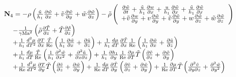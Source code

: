 \begin{equation*}
  \begin{array}{l}
 {\bf{N}}_4  =  - \rho \left( {\frac{{\tilde u}}{{h_1 }}\frac{{\partial \tilde w}}{{\partial x}} + \tilde v\frac{{\partial \tilde w}}{{\partial y}} + \tilde w\frac{{\partial \tilde w}}{{\partial z}}} \right) - \tilde \rho \left( \begin{array}{l}
 \frac{{\partial \tilde w}}{{\partial t}} + \frac{{\tilde u}}{{h_1 }}\frac{{\partial w}}{{\partial x}} + \frac{u}{{h_1 }}\frac{{\partial \tilde w}}{{\partial x}} + \frac{{\tilde u}}{{h_1 }}\frac{{\partial \tilde w}}{{\partial x}} \\
  + \tilde v\frac{{\partial w}}{{\partial y}} + v\frac{{\partial \tilde w}}{{\partial y}} + \tilde v\frac{{\partial \tilde w}}{{\partial y}} + w\frac{{\partial \tilde w}}{{\partial z}} + \tilde w\frac{{\partial \tilde w}}{{\partial z}} \\
 \end{array} \right) \\
 \quad \; - \frac{1}{{\gamma {\rm{Ma}}^2 }}\left( {\tilde \rho \frac{{\partial \tilde T}}{{\partial z}} + \tilde T\frac{{\partial \tilde \rho }}{{\partial z}}} \right) \\
 \quad \; + \frac{1}{{h_1 }}\frac{{d^2 \mu }}{{dT^2 }}\frac{{\partial T}}{{\partial x}}\frac{{\tilde T}}{{{\mathop{\rm Re}\nolimits} }}\left( {\frac{1}{{h_1 }}\frac{{\partial \tilde w}}{{\partial x}} + \frac{{\partial \tilde u}}{{\partial z}}} \right) + \frac{1}{{h_1 }}\frac{{d\mu }}{{dT}}\frac{{\partial \tilde T}}{{\partial x}}\frac{1}{{{\mathop{\rm Re}\nolimits} }}\left( {\frac{1}{{h_1 }}\frac{{\partial \tilde w}}{{\partial x}} + \frac{{\partial \tilde u}}{{\partial z}}} \right) \\
 \quad \; + \frac{1}{{h_1 }}\frac{{d\mu }}{{dT}}\frac{{\tilde T}}{{{\mathop{\rm Re}\nolimits} }}\left( {\frac{1}{{h_1 }}\frac{{\partial ^2 \tilde w}}{{\partial x^2 }} + \frac{{\partial ^2 \tilde u}}{{\partial x\partial z}}} \right) + \frac{1}{{h_1 }}\frac{{\partial h_1 }}{{\partial y}}\frac{1}{{{\mathop{\rm Re}\nolimits} }}\frac{{\partial \mu }}{{\partial T}}\tilde T\left( {\frac{{\partial \tilde v}}{{\partial z}} + \frac{{\partial \tilde w}}{{\partial y}}} \right) \\
 \quad \; + \frac{1}{{{\mathop{\rm Re}\nolimits} }}\frac{{d^2 \mu }}{{dT^2 }}\frac{{\partial T}}{{\partial y}}\tilde T\left( {\frac{{\partial \tilde v}}{{\partial z}} + \frac{{\partial \tilde w}}{{\partial y}}} \right) + \frac{1}{{{\mathop{\rm Re}\nolimits} }}\frac{{d\mu }}{{dT}}\frac{{\partial \tilde T}}{{\partial y}}\left( {\frac{{\partial \tilde v}}{{\partial z}} + \frac{{\partial \tilde w}}{{\partial y}}} \right) + \frac{1}{{{\mathop{\rm Re}\nolimits} }}\frac{{\partial \mu }}{{\partial T}}\tilde T\left( {\frac{{\partial ^2 \tilde v}}{{\partial y\partial z}} + \frac{{\partial ^2 \tilde w}}{{\partial y^2 }}} \right) \\

\end{array}
\end{equation*}
